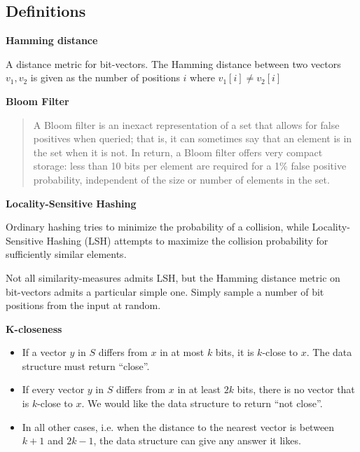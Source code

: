 \documentclass[a4paper,11pt]{article}
\begin{document}
\subsection{Definitions}
\begin{description}
\item \textbf{Hamming distance}

A distance metric for bit-vectors. The Hamming distance between two vectors $v_1, v_2$ is given as the number of positions $i$ where $v_1[i] \neq v_2[i]$

\item \textbf{Bloom Filter}

\begin{quotation}
A Bloom filter is an inexact representation of a set that allows for false positives when queried; that is, it can sometimes say that an element is in the set when it is not. In return, a Bloom filter offers very compact storage: less than 10 bits per element are required for a 1\% false positive probability, independent of the size or number of elements in the set.\cite{paper:bloom}
\end{quotation}


\item \textbf{Locality-Sensitive Hashing}

Ordinary hashing tries to minimize the probability of a collision, while Locality-Sensitive Hashing (LSH) attempts to maximize the collision probability for sufficiently similar elements.

Not all similarity-measures admits LSH, but the Hamming distance metric on bit-vectors admits a particular simple one.
Simply sample a number of bit positions from the input at random.

\item \textbf{K-closeness} %
  \begin{itemize}
    \item If a vector $y$ in $S$ differs from $x$ in at most $k$ bits, it is $k$-close to $x$. The data structure must return “close”.
    \item If every vector $y$ in $S$ differs from $x$ in at least $2k$ bits, there is no vector that is $k$-close to $x$. We would like the data structure to return “not close”.
    \item In all other cases, i.e. when the distance to the nearest vector is between $k+1$ and $2k-1$, the data structure can give any answer it likes.
  \end{itemize}

\end{description}
\end{document}
